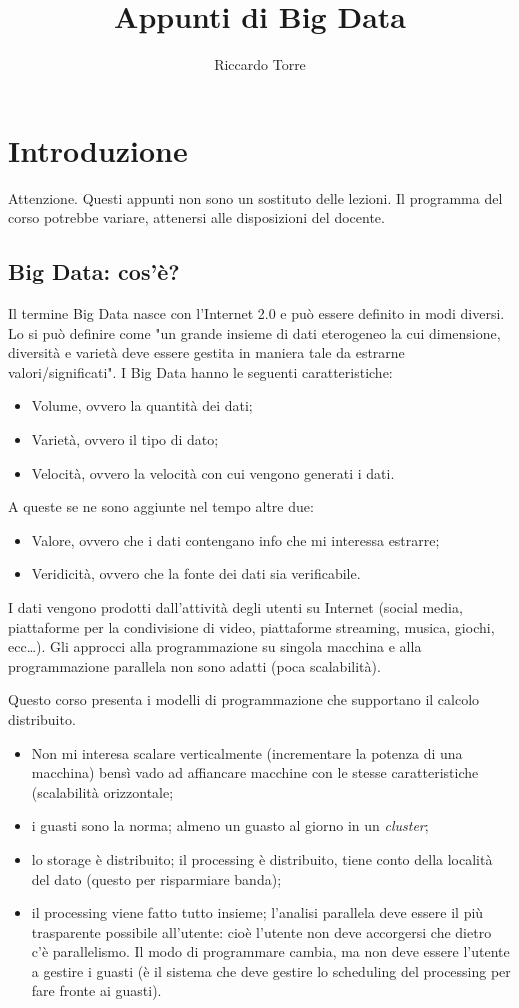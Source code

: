 \documentclass[italian,10pt,a4paper]{report}
\title{Appunti di Big Data}
\author{Riccardo Torre}
\begin{document}
	\maketitle
	\tableofcontents
	\chapter{Introduzione}
	Attenzione. Questi appunti non sono un sostituto delle lezioni. Il programma del corso potrebbe variare, attenersi alle disposizioni del docente.
	\section{Big Data: cos'è?} Il termine Big Data nasce con l'Internet 2.0 e può essere definito in modi diversi. Lo si può definire come "un grande insieme di dati eterogeneo la cui dimensione, diversità e varietà deve essere gestita in maniera tale da estrarne valori/significati". I Big Data hanno le seguenti caratteristiche:
	\begin{itemize}
		\item Volume, ovvero la quantità dei dati;
		\item Varietà, ovvero il tipo di dato;
		\item Velocità, ovvero la velocità con cui vengono generati i dati.
	\end{itemize}
	A queste se ne sono aggiunte nel tempo altre due:
	\begin{itemize}
		\item Valore, ovvero che i dati contengano info che mi interessa estrarre;
		\item Veridicità, ovvero che la fonte dei dati sia verificabile.
	\end{itemize}
	I dati vengono prodotti dall'attività degli utenti su Internet (social media, piattaforme per la condivisione di video, piattaforme streaming, musica, giochi, ecc\dots). 
	Gli approcci alla programmazione su singola macchina e alla programmazione parallela non sono adatti (poca scalabilità).
	
	Questo corso presenta i modelli di programmazione che supportano il calcolo distribuito.
	\begin{itemize}
		\item Non mi interesa scalare verticalmente (incrementare la potenza di una macchina) bensì vado ad affiancare macchine con le stesse caratteristiche (scalabilità orizzontale;
		\item i guasti sono la norma; almeno un guasto al giorno in un \textit{cluster};
		\item lo storage è distribuito; il processing è distribuito, tiene conto della località del dato (questo per risparmiare banda);
		\item il processing viene fatto tutto insieme; l'analisi parallela deve essere il più trasparente possibile all'utente: cioè l'utente non deve accorgersi che dietro c'è parallelismo. Il modo di programmare cambia, ma non deve essere l'utente a gestire i guasti (è il sistema che deve gestire lo scheduling del processing per fare fronte ai guasti).
	\end{itemize}
\end{document}
